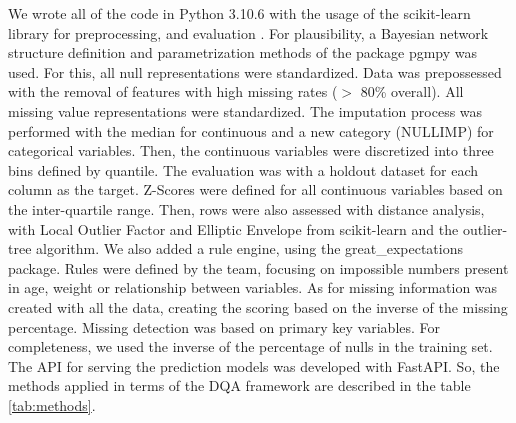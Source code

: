 We wrote all of the code in Python 3.10.6 with the usage of the scikit-learn library for preprocessing, and evaluation \cite{scikit-learn}. 
For plausibility, a Bayesian network structure definition and parametrization methods of the package pgmpy \cite{pgmpy} was used. For this, all null representations were standardized. Data was prepossessed with the removal of features with high missing rates ($>$ 80\% overall). All missing value representations were standardized. The imputation process was performed with the median for continuous and a new category (NULLIMP) for categorical variables. Then, the continuous variables were discretized into three bins defined by quantile. The evaluation was with a holdout dataset for each column as the target. Z-Scores were defined for all continuous variables based on the inter-quartile range. Then, rows were also assessed with distance analysis, with Local Outlier Factor and Elliptic Envelope from scikit-learn and the outlier-tree algorithm. We also added a rule engine, using the great\_expectations package. Rules were defined by the team, focusing on impossible numbers present in age, weight or relationship between variables. As for missing information was created with all the data, creating the scoring based on the inverse of the missing percentage. Missing detection was based on primary key variables.
For completeness, we used the inverse of the percentage of nulls in the training set.
The API for serving the prediction models was developed with FastAPI. So, the methods applied in terms of the DQA framework are described in the table \ref{tab:methods}.

